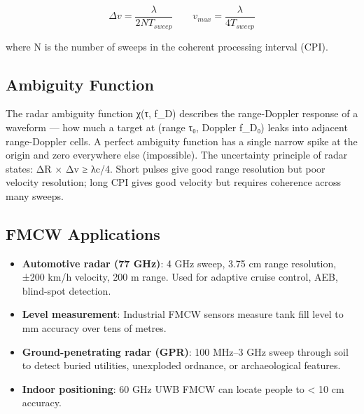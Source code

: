 
      
\[\Delta v = \dfrac{\lambda}{2 N T_{sweep}}\qquad v_{max} = \dfrac{\lambda}{4 T_{sweep}}\]

      

where N is the number of sweeps in the coherent processing interval (CPI).

      

\subsection{Ambiguity Function}

      

The radar ambiguity function χ(τ, f\_D) describes the range-Doppler response of a waveform — how much a target at (range τ₀, Doppler f\_D₀) leaks into adjacent range-Doppler cells. A perfect ambiguity function has a single narrow spike at the origin and zero everywhere else (impossible). The uncertainty principle of radar states: ΔR × Δv ≥ λc/4. Short pulses give good range resolution but poor velocity resolution; long CPI gives good velocity but requires coherence across many sweeps.

      

\subsection{FMCW Applications}

      
\begin{itemize}

        \item \textbf{Automotive radar (77 GHz)}: 4 GHz sweep, 3.75 cm range resolution, ±200 km/h velocity, 200 m range. Used for adaptive cruise control, AEB, blind-spot detection.

        \item \textbf{Level measurement}: Industrial FMCW sensors measure tank fill level to mm accuracy over tens of metres.

        \item \textbf{Ground-penetrating radar (GPR)}: 100 MHz–3 GHz sweep through soil to detect buried utilities, unexploded ordnance, or archaeological features.

        \item \textbf{Indoor positioning}: 60 GHz UWB FMCW can locate people to \textless{} 10 cm accuracy.

      
\end{itemize}



